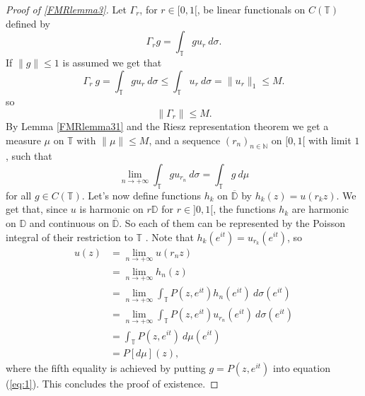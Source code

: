 \documentclass[a4paper,12pt,twoside,BCOR=10mm]{scrbook}
\theoremstyle{definition}
\theoremstyle{definition}
\theoremstyle{definition}
\begin{document}
\begin{proof}[Proof of \ref{FMRlemma3}]
Let $\Gamma_r$, for $r \in [0, 1[$, be linear functionals on $C(\mathbb{T})$ defined by
\[
	\Gamma_r g = \int_{\mathbb{T}} gu_r\ d\sigma.
\]
If $\|g\| \leq 1$ is assumed we get that
\[
\Gamma_r\ g = \int_{\mathbb{T}} gu_r\ d\sigma \leq \int_{\mathbb{T}} u_r\ d\sigma = \|u_r\|_1 \leq M.
\]
so
\[
	\|\Gamma_r\| \leq M.
\]
By Lemma \ref{FMRlemma31} and the Riesz representation theorem we get a measure $\mu$ on $\mathbb{T}$ with $\|\mu\| \leq M$, and a sequence $(r_n)_{n \in \mathbb{N}}$ on $[0, 1[$ with limit $1$, such that
\begin{equation}
	\label{eq:1}
	\lim_{n \rightarrow +\infty} \int_{\mathbb{T}} gu_{r_n}\ d\sigma = \int_{\mathbb{T}}g\ d\mu
\end{equation}
for all $g \in C(\mathbb{T})$.
Let's now define functions $h_k$ on $\overline{\mathbb{D}}$ by $h_k(z) = u(r_kz)$.
We get that, since $u$ is harmonic on $r\mathbb{D}$ for $r \in ]0, 1[$, the functions $h_k$ are harmonic on $\mathbb{D}$ and continuous on $\overline{\mathbb{D}}$.
So each of them can be represented by the Poisson integral of their restriction to $\mathbb{T}$ \citep[Theorem $11.9$]{rudin2}.
Note that $h_k(e^{it}) = u_{r_k}(e^{it})$, so
\begin{align*}
	u(z)
	&= \lim_{n \rightarrow +\infty} u(r_nz)\\
	&= \lim_{n \rightarrow +\infty} h_n(z)\\
	&= \lim_{n \rightarrow +\infty} \int_{\mathbb{T}}P(z, e^{it}) h_n(e^{it})\ d\sigma(e^{it})\\
	&= \lim_{n \rightarrow +\infty} \int_{\mathbb{T}}P(z, e^{it}) u_{r_n}(e^{it})\ d\sigma(e^{it})\\
	&= \int_{\mathbb{T}}P(z, e^{it})\ d\mu(e^{it})\\
	&= P[d\mu](z),
\end{align*}
where the fifth equality is achieved by putting $g = P(z, e^{it})$ into equation (\ref{eq:1}).
This concludes the proof of existence.


\end{proof}
\end{document}
